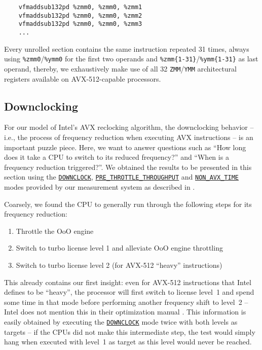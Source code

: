 \begin{center}
	\begin{verbatim}
	vfmaddsub132pd %zmm0, %zmm0, %zmm1
	vfmaddsub132pd %zmm0, %zmm0, %zmm2
	vfmaddsub132pd %zmm0, %zmm0, %zmm3
	...
	\end{verbatim}
\end{center}

Every unrolled section contains the same instruction repeated 31 times, always using \texttt{\%zmm0}/\texttt{\%ymm0} for the first two operands and \texttt{\%zmm\{1-31\}}/\texttt{\%ymm\{1-31\}} as last operand, thereby, we exhaustively make use of all 32 \texttt{ZMM}/\texttt{YMM} architectural registers available on \gls{AVX-512}-capable processors.

\subsection{Downclocking}
\label{sec:analysis:results:downclocking}

For our model of Intel's \gls{AVX} reclocking algorithm, the downclocking behavior -- i.e., the process of frequency reduction when executing \gls{AVX} instructions -- is an important puzzle piece. Here, we want to answer questions such as \enquote{How long does it take a \gls{CPU} to switch to its reduced frequency?} and \enquote{When is a frequency reduction triggered?}. We obtained the results to be presented in this section using the \hyperref[sec:analysis:design:measurementmodes:downclock]{\texttt{DOWNCLOCK}}, \hyperref[sec:analysis:design:measurementmodes:prethrottlethroughput]{\texttt{PRE\_THROTTLE\_THROUGHPUT}} and \hyperref[sec:analysis:design:measurementmodes:nonavxtime]{\texttt{NON\_AVX\_TIME}} modes provided by our measurement system as described in .

Coarsely, we found the \gls{CPU} to generally run through the following steps for its frequency reduction:

\begin{enumerate}
	\item Throttle the \acrlong{OoO} engine
	\item Switch to turbo license level 1 and alleviate \gls{OoO} engine throttling
	\item Switch to turbo license level 2 (for \gls{AVX-512} \enquote{heavy} instructions)
\end{enumerate}

This already contains our first insight: even for \gls{AVX-512} instructions that Intel defines to be \enquote{heavy}, the processor will first switch to license level~1 and spend some time in that mode before performing another frequency shift to level~2 -- Intel does not mention this in their optimization manual \cite{inteloptimizationmanual}. This information is easily obtained by executing the \hyperref[sec:analysis:design:measurementmodes:downclock]{\texttt{DOWNCLOCK}} mode twice with both levels as targets -- if the \glspl{CPU} did not make this intermediate step, the test would simply hang when executed with level~1 as target as this level would never be reached.

